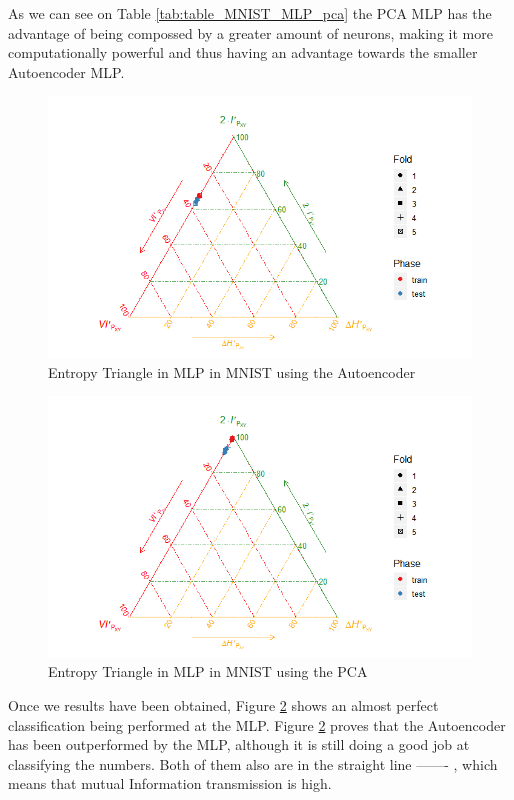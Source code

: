 As we can see on Table \ref{tab:table_MNIST_MLP_pca} the PCA MLP has the advantage of being compossed by a greater amount of neurons, making it more computationally powerful and thus having an advantage towards the smaller Autoencoder MLP. 


\begin{figure}[H]
	\centering
	\includegraphics[width=1\linewidth]{Figuras_tfg/MNIST_Autoencoder_mlp}
	\caption{Entropy Triangle in MLP in MNIST using the Autoencoder}
	\label{fig:figure_MLP_MNIST_ET_Auto}
\end{figure}

\begin{figure}[H]
	\centering
	\includegraphics[width=1\linewidth]{Figuras_tfg/MNIST_PCA_mlp}
	\caption{Entropy Triangle in MLP in MNIST using the PCA}
	\label{fig:figure_MLP_MNIS_ET_PCA}
\end{figure}

Once we results have been obtained, Figure \ref{fig:figure_MLP_MNIS_ET_PCA} shows an almost perfect classification being performed at the MLP. Figure \ref{fig:figure_MLP_MNIS_ET_PCA} proves that the Autoencoder has been outperformed by the MLP, although it is still doing a good job at classifying the numbers. Both of them also are in the straight line ------- , which means that mutual Information transmission is high.

